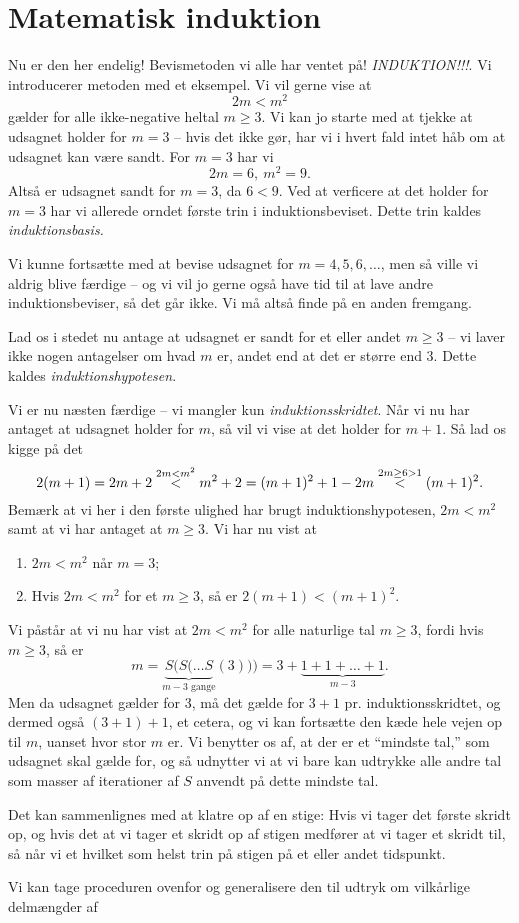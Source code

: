 \documentclass[a4paper, 12pt]{article}
\numberwithin{equation}{section}
\theoremstyle{plain}
\theoremstyle{definition}
\begin{document}
\section{Matematisk induktion}
Nu er den her endelig! Bevismetoden vi alle har ventet på! \emph{INDUKTION!!!}. Vi introducerer metoden med et eksempel. Vi vil gerne vise at 
\[
  2m<m^2
\]
gælder for alle ikke-negative heltal \(m\ge 3\). Vi kan jo starte med at tjekke at udsagnet holder for \(m=3\) -- hvis det ikke gør, har vi i hvert fald intet håb om at udsagnet kan være sandt. For \(m=3\) har vi
\[
  2m=6,\ m^2=9.
  \]
  Altså er udsagnet sandt for \(m=3\), da \(6<9\). Ved at verficere at det holder for \(m=3\) har vi allerede orndet første trin i induktionsbeviset. Dette trin kaldes \emph{induktionsbasis.}

  Vi kunne fortsætte med at bevise udsagnet for \(m=4,5,6,\ldots\), men så ville vi aldrig blive færdige -- og vi vil jo gerne også have tid til at lave andre induktionsbeviser, så det går ikke. Vi må altså finde på en anden fremgang.

  Lad os i stedet nu antage at udsagnet er sandt for et eller andet \(m\ge 3\) -- vi laver ikke nogen antagelser om hvad \(m\) er, andet end at det er større end 3. Dette kaldes \emph{induktionshypotesen}.

  Vi er nu næsten færdige -- vi mangler kun \emph{induktionsskridtet}. Når vi nu har antaget at udsagnet holder for \(m\), så vil vi vise at det holder for \(m+1\). Så lad os kigge på det
  \[
    2(m+1)=2m+2\buildrel{2m<m^2}\over{<}m^2+2=(m+1)^2+1-2m\buildrel{2m\ge 6>1}\over <(m+1)^2.
    \]
    Bemærk at vi her i den første ulighed har brugt induktionshypotesen, \(2m<m^2\) samt at vi har antaget at \(m\ge 3\). Vi har nu vist at
    \begin{enumerate}
    \item \(2m<m^2\) når \(m=3\);
      \item Hvis \(2m<m^2\) for et \(m\ge 3\), så er \(2(m+1)<(m+1)^2\).
    \end{enumerate}
    Vi påstår at vi nu har vist at \(2m<m^2\) for alle naturlige tal \(m\ge 3\), fordi hvis \(m\ge 3\), så er
    \[
      m=\underbrace{S(S(\ldots S}_{m-3\text{ gange}}(3)))=3+\underbrace{1+1+\ldots+1}_{m-3}.
      \]
      Men da udsagnet gælder for 3, må det gælde for \(3+1\) pr. induktionsskridtet, og dermed også \((3+1)+1\), et cetera, og vi kan fortsætte den kæde hele vejen op til \(m\), uanset hvor stor \(m\) er. Vi benytter os af, at der er et ``mindste tal,'' som udsagnet skal gælde for, og så udnytter vi at vi bare kan udtrykke alle andre tal som masser af iterationer af \(S\) anvendt på dette mindste tal.

      Det kan sammenlignes med at klatre op af en stige: Hvis vi tager det første skridt op, og hvis det at vi tager et skridt op af stigen medfører at vi tager et skridt til, så når vi et hvilket som helst trin på stigen på et eller andet tidspunkt.

Vi kan tage proceduren ovenfor og generalisere den til udtryk om vilkårlige delmængder af 
\end{document}
